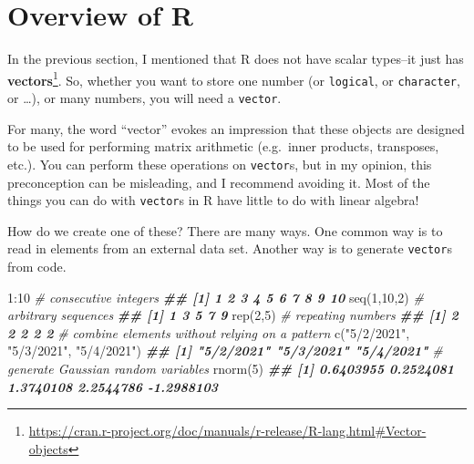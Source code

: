 \documentclass[
  12pt,
  krantz2]{krantz}
\makeatletter
\newenvironment{Shaded}{\begin{snugshade}}{\end{snugshade}}
\newcommand{\CommentTok}[1]{\textcolor[rgb]{0.37,0.37,0.37}{\textit{#1}}}
\newcommand{\DecValTok}[1]{\textcolor[rgb]{0.06,0.06,0.06}{#1}}
\newcommand{\DocumentationTok}[1]{\textcolor[rgb]{0.37,0.37,0.37}{\textbf{\textit{#1}}}}
\newcommand{\FunctionTok}[1]{\textcolor[rgb]{0,0,0}{#1}}
\newcommand{\NormalTok}[1]{#1}
\newcommand{\SpecialCharTok}[1]{\textcolor[rgb]{0,0,0}{#1}}
\newcommand{\StringTok}[1]{\textcolor[rgb]{0.5,0.5,0.5}{#1}}
\renewcommand{\href}[2]{#2\footnote{\url{#1}}}
\newenvironment{kframe}{%
\medskip{}
\setlength{\fboxsep}{.8em}
 \def\at@end@of@kframe{}%
 \ifinner\ifhmode%
  \def\at@end@of@kframe{\end{minipage}}%
  \begin{minipage}{\columnwidth}%
 \fi\fi%
 \def\FrameCommand##1{\hskip\@totalleftmargin \hskip-\fboxsep
 \colorbox{shadecolor}{##1}\hskip-\fboxsep
     \hskip-\linewidth \hskip-\@totalleftmargin \hskip\columnwidth}%
 \MakeFramed {\advance\hsize-\width
   \@totalleftmargin\z@ \linewidth\hsize
   \@setminipage}}%
 {\par\unskip\endMakeFramed%
 \at@end@of@kframe}
\renewenvironment{Shaded}{\begin{kframe}}{\end{kframe}}
\makeatother
\begin{document}
\hypertarget{overview-of-r}{%
\section{Overview of R}\label{overview-of-r}}

In the previous section, I mentioned that R does not have scalar types--it just has \href{https://cran.r-project.org/doc/manuals/r-release/R-lang.html\#Vector-objects}{\textbf{vectors}}. So, whether you want to store one number (or \texttt{logical}, or \texttt{character}, or \ldots), or many numbers, you will need a \texttt{vector}.

\begin{rmd-caution}
For many, the word ``vector'' evokes an impression that these objects are designed to be used for performing matrix arithmetic (e.g.~inner products, transposes, etc.). You can perform these operations on \texttt{vector}s, but in my opinion, this preconception can be misleading, and I recommend avoiding it. Most of the things you can do with \texttt{vector}s in R have little to do with linear algebra!

\end{rmd-caution}

How do we create one of these? There are many ways. One common way is to read in elements from an external data set. Another way is to generate \texttt{vector}s from code.

\begin{Shaded}
\begin{Highlighting}[]
\DecValTok{1}\SpecialCharTok{:}\DecValTok{10}         \CommentTok{\# consecutive integers}
\DocumentationTok{\#\#  [1]  1  2  3  4  5  6  7  8  9 10}
\FunctionTok{seq}\NormalTok{(}\DecValTok{1}\NormalTok{,}\DecValTok{10}\NormalTok{,}\DecValTok{2}\NormalTok{)  }\CommentTok{\# arbitrary sequences}
\DocumentationTok{\#\# [1] 1 3 5 7 9}
\FunctionTok{rep}\NormalTok{(}\DecValTok{2}\NormalTok{,}\DecValTok{5}\NormalTok{)     }\CommentTok{\# repeating numbers}
\DocumentationTok{\#\# [1] 2 2 2 2 2}
\CommentTok{\# combine elements without relying on a pattern}
\FunctionTok{c}\NormalTok{(}\StringTok{"5/2/2021"}\NormalTok{, }\StringTok{"5/3/2021"}\NormalTok{, }\StringTok{"5/4/2021"}\NormalTok{) }
\DocumentationTok{\#\# [1] "5/2/2021" "5/3/2021" "5/4/2021"}
\CommentTok{\# generate Gaussian random variables}
\FunctionTok{rnorm}\NormalTok{(}\DecValTok{5}\NormalTok{)                             }
\DocumentationTok{\#\# [1]  0.6403955  0.2524081  1.3740108  2.2544786 {-}1.2988103}
\end{Highlighting}
\end{Shaded}
\end{document}
